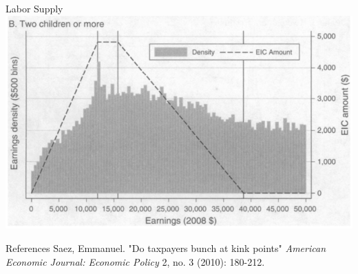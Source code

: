 \documentclass{beamer}
\begin{document}
\begin{frame}{Labor Supply}
\includegraphics[width = \textwidth]{images/saez2010.png}
\end{frame}

\begin{frame}{References}
Saez, Emmanuel. "Do taxpayers bunch at kink points" \textit{American Economic Journal: Economic Policy} 2, no. 3 (2010): 180-212.
\end{frame}
\end{document}
